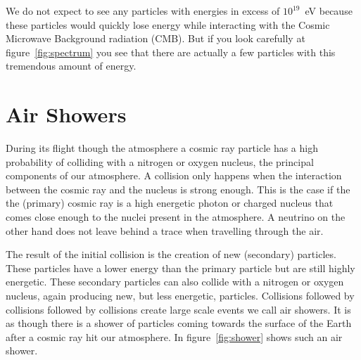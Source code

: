 \documentclass[12pt,a4paper]{article}
\numberwithin{equation}{section}
\numberwithin{figure}{section}
\numberwithin{table}{section}
\begin{document}
We do not expect to see any particles with energies in excess of $10^{19}$~eV because these particles would quickly lose energy while interacting with the Cosmic Microwave Background radiation (CMB). But if you look carefully at figure~\ref{fig:spectrum} you see that there are actually a few particles with this tremendous amount of energy.

\section{Air Showers}
During its flight though the atmosphere a cosmic ray particle has a high probability of colliding with a nitrogen or oxygen nucleus, the principal components of our atmosphere. A collision only happens when the interaction between the cosmic ray and the nucleus is strong enough. This is the case if the the (primary) cosmic ray is a high energetic photon or charged nucleus that comes close enough to the nuclei present in the atmosphere. A neutrino on the other hand does not leave behind a trace when travelling through the air.

The result of the initial collision is the creation of new (secondary) particles. These particles have a lower energy than the primary particle but are still highly energetic. These secondary particles can also collide with a nitrogen or oxygen nucleus, again producing new, but less energetic, particles. Collisions followed by collisions followed by collisions create large scale events we call air showers. It is as though there is a shower of particles coming towards the surface of the Earth after a cosmic ray hit our atmosphere. In figure~\ref{fig:shower} shows such an air shower.
\end{document}
